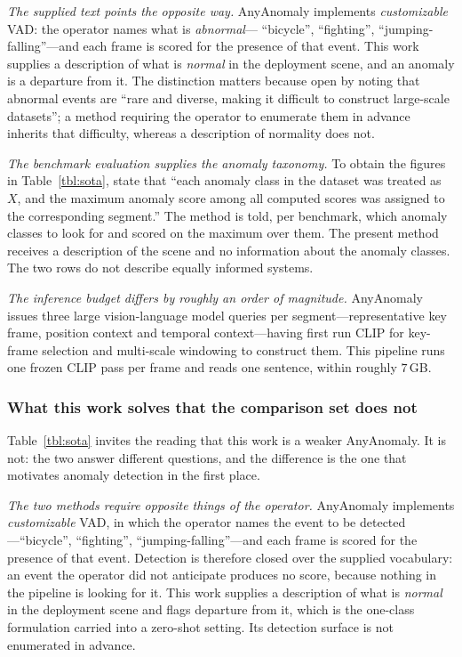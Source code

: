 \documentclass[a4paper,fleqn]{cas-sc}
\begin{document}
\emph{The supplied text points the opposite way.} AnyAnomaly implements
\emph{customizable} VAD: the operator names what is \emph{abnormal}---
``bicycle'', ``fighting'', ``jumping-falling''---and each frame is scored for the
presence of that event. This work supplies a description of what is
\emph{normal} in the deployment scene, and an anomaly is a departure from it.
The distinction matters because \citet{anyanomaly2025} open by noting that
abnormal events are ``rare and diverse, making it difficult to construct
large-scale datasets''; a method requiring the operator to enumerate them in
advance inherits that difficulty, whereas a description of normality does not.

\emph{The benchmark evaluation supplies the anomaly taxonomy.} To obtain the
figures in Table~\ref{tbl:sota}, \citet{anyanomaly2025} state that ``each
anomaly class in the dataset was treated as $X$, and the maximum anomaly score
among all computed scores was assigned to the corresponding segment.'' The
method is told, per benchmark, which anomaly classes to look for and scored on
the maximum over them. The present method receives a description of the scene
and no information about the anomaly classes. The two rows do not describe
equally informed systems.

\emph{The inference budget differs by roughly an order of magnitude.}
AnyAnomaly issues three large vision-language model queries per
segment---representative key frame, position context and temporal
context---having first run CLIP for key-frame selection and multi-scale
windowing to construct them. This pipeline runs one frozen CLIP pass per frame
and reads one sentence, within roughly $7$\,GB.

\subsubsection{What this work solves that the comparison set does not}
\label{sec:res-openset}
Table~\ref{tbl:sota} invites the reading that this work is a weaker AnyAnomaly.
It is not: the two answer different questions, and the difference is the one that
motivates anomaly detection in the first place.

\emph{The two methods require opposite things of the operator.} AnyAnomaly
implements \emph{customizable} VAD, in which the operator names the event to be
detected---``bicycle'', ``fighting'', ``jumping-falling''---and each frame is
scored for the presence of that event. Detection is therefore closed over the
supplied vocabulary: an event the operator did not anticipate produces no
score, because nothing in the pipeline is looking for it. This work supplies a
description of what is \emph{normal} in the deployment scene and flags departure
from it, which is the one-class formulation carried into a zero-shot setting.
Its detection surface is not enumerated in advance.
\end{document}
